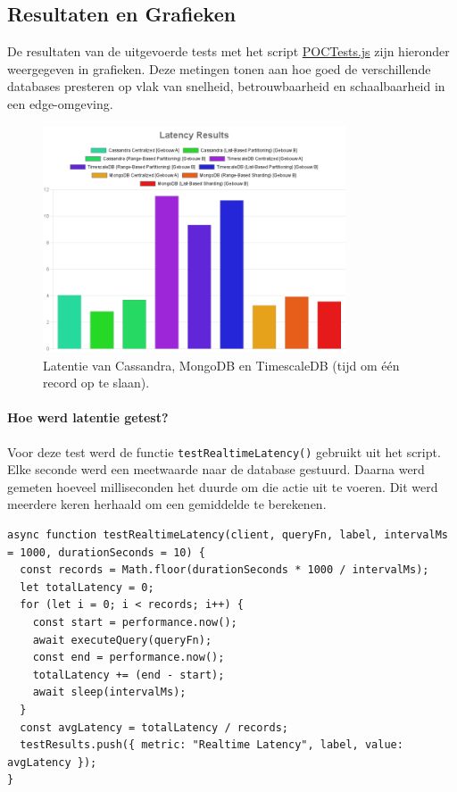 \subsection{Resultaten en Grafieken}

De resultaten van de uitgevoerde tests met het script \href{https://github.com/WoutVC/bachelorproef2024/blob/main/proof_of_concept/backend/POCTests.js}{POCTests.js} zijn hieronder weergegeven in grafieken. Deze metingen tonen aan hoe goed de verschillende databases presteren op vlak van snelheid, betrouwbaarheid en schaalbaarheid in een edge-omgeving.

\begin{figure}[H]
	\centering
	\includegraphics[width=0.8\textwidth]{Latency.png}
	\caption{Latentie van Cassandra, MongoDB en TimescaleDB (tijd om één record op te slaan).}
	\label{fig:latency-comparison}
\end{figure}

\paragraph{Hoe werd latentie getest?}
Voor deze test werd de functie \texttt{testRealtimeLatency()} gebruikt uit het script. Elke seconde werd een meetwaarde naar de database gestuurd. Daarna werd gemeten hoeveel milliseconden het duurde om die actie uit te voeren. Dit werd meerdere keren herhaald om een gemiddelde te berekenen.

\begin{verbatim}
async function testRealtimeLatency(client, queryFn, label, intervalMs = 1000, durationSeconds = 10) {
  const records = Math.floor(durationSeconds * 1000 / intervalMs);
  let totalLatency = 0;
  for (let i = 0; i < records; i++) {
    const start = performance.now();
    await executeQuery(queryFn);
    const end = performance.now();
    totalLatency += (end - start);
    await sleep(intervalMs);
  }
  const avgLatency = totalLatency / records;
  testResults.push({ metric: "Realtime Latency", label, value: avgLatency });
}
\end{verbatim}

